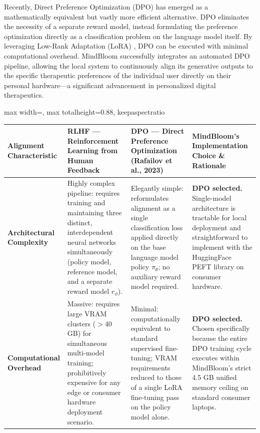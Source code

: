 \documentclass[12pt,twoside]{article}
\begin{document}
Recently, Direct Preference Optimization (DPO) \citep{rafailov2023dpo} has emerged as a mathematically equivalent but vastly more efficient alternative. DPO eliminates the necessity of a separate reward model, instead formulating the preference optimization directly as a classification problem on the language model itself. By leveraging Low-Rank Adaptation (LoRA) \citep{hu2021lora}, DPO can be executed with minimal computational overhead. MindBloom successfully integrates an automated DPO pipeline, allowing the local system to continuously align its generative outputs to the specific therapeutic preferences of the individual user directly on their personal hardware---a significant advancement in personalized digital therapeutics.

\begin{table}[p]
\centering
\Large
\renewcommand{\arraystretch}{4.2}
\setlength{\tabcolsep}{14pt}
\begin{adjustbox}{max width=\textwidth, max totalheight=0.88\textheight, keepaspectratio}
\begin{tabular}{|p{5.0cm}|p{7.2cm}|p{7.2cm}|p{7.2cm}|}
\hline
\rowcolor{gray!20}
\textbf{Alignment Characteristic} & \textbf{RLHF --- Reinforcement Learning from Human Feedback} & \textbf{DPO --- Direct Preference Optimization (Rafailov et al., 2023)} & \textbf{MindBloom's Implementation Choice \& Rationale} \\
\hline
\textbf{Architectural Complexity} & Highly complex pipeline: requires training and maintaining three distinct, interdependent neural networks simultaneously (policy model, reference model, and a separate reward model $r_\phi$). & Elegantly simple: reformulates alignment as a single classification loss applied directly on the base language model policy $\pi_\theta$; no auxiliary reward model required. & \textbf{DPO selected.} Single-model architecture is tractable for local deployment and straightforward to implement with the HuggingFace PEFT library on consumer hardware. \\
\hline
\textbf{Computational Overhead} & Massive: requires large VRAM clusters ($>$40 GB) for simultaneous multi-model training; prohibitively expensive for any edge or consumer hardware deployment scenario. & Minimal: computationally equivalent to standard supervised fine-tuning; VRAM requirements reduced to those of a single LoRA fine-tuning pass on the policy model alone. & \textbf{DPO selected.} Chosen specifically because the entire DPO training cycle executes within MindBloom's strict 4.5 GB unified memory ceiling on standard consumer laptops. \\

\end{tabular}
\end{adjustbox}
\end{table}
\end{document}
